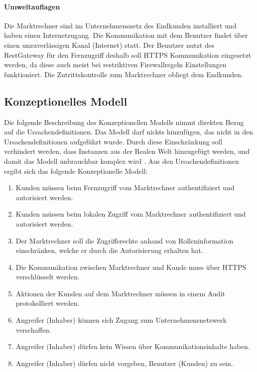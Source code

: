 \documentclass[11pt,a4paper]{report}
\begin{document}
\paragraph{Umweltauflagen} Die Marktrechner sind im Unternehmensnetz des Endkunden installiert und haben einen Internetzugang. Die Kommunikation mit dem Benutzer findet über einen unzuverlässigen Kanal (Internet) statt. Der Benutzer nutzt des RestGateway für den Fernzugriff deshalb soll HTTPS Kommunikation eingesetzt werden, da diese auch meist bei restriktiven Firewallregeln Einstellungen funktioniert. Die Zutrittskontrolle zum Marktrechner obliegt dem Endkunden.

\subsection{Konzeptionelles Modell}

Die folgende Beschreibung des Konzeptionellen Modells nimmt direkten Bezug auf die Ursachendefinitionen. Das Modell darf nichts hinzufügen, das nicht in den Ursachendefinitionen aufgeführt wurde. Durch diese Einschränkung soll verhindert werden, dass Instanzen aus der Realen Welt hinzugefügt werden, und damit das Modell unbrauchbar komplex wird \cite[s.~256]{gutmann}. Aus den Ursachendefinitionen ergibt sich das folgende Konzeptionelle Modell:

\begin{enumerate}[leftmargin=*]
\item Kunden müssen beim Fernzugriff vom Marktrechner authentifiziert und autorisiert werden.
\item Kunden müssen beim lokalen Zugriff vom Marktrechner authentifiziert und autorisiert werden.
\item Der Marktrechner soll die Zugriffsrechte anhand von Rolleninformation einschränken, welche er durch die Autorisierung erhalten hat.
\item Die Kommunikation zwischen Marktrechner und Kunde muss über HTTPS verschlüsselt werden.
\item Aktionen der Kunden auf dem Marktrechner müssen in einem Audit protokolliert werden.
\item Angreifer (Inhaber) können sich Zugang zum Unternehmensnetzwerk verschaffen.
\item Angreifer (Inhaber) dürfen kein Wissen über Kommunikationsinhalte haben.
\item Angreifer (Inhaber) dürfen nicht vorgeben, Benutzer (Kunden) zu sein.
\end{enumerate}
\end{document}
